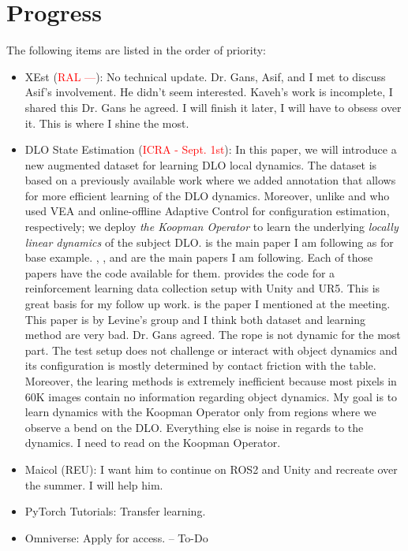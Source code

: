 \documentclass[11pt]{article}
\begin{document}
\section{Progress}
The following items are listed in the order of priority:
\begin{itemize}
    \item XEst (\textcolor{red}{RAL ---}): No technical update. Dr. Gans, Asif,
    and I met to discuss Asif's involvement. He didn't seem interested.
    Kaveh's work is incomplete, I shared this Dr. Gans he agreed. I will finish
    it later, I will have to obsess over it. This is where I shine the most.

    \item DLO State Estimation (\textcolor{red}{ICRA - Sept. 1st}): In this
    paper, we will introduce a new augmented dataset for learning DLO local
    dynamics. The dataset is based on a previously available work
    \cite{zhang2021deformable} where we added annotation that allows for more
    efficient learning of the DLO dynamics. Moreover, unlike \cite{zhang2021deformable}
    and \cite{yu2022shape} who used VEA and online-offline Adaptive Control for
    configuration estimation, respectively;
    we deploy \emph{the Koopman Operator} to
    learn the underlying \emph{locally linear dynamics} of the subject DLO.
    \cite{zhang2021deformable} is the main paper I am following as for base
    example. \cite{yu2022shape}, \cite{zhang2021deformable}, and \cite{zhang2021robots}
    are the main papers I am following. Each of those papers have the code
    available for them. \cite{yu2022shape} provides the code for a reinforcement
    learning data collection setup with Unity and UR5. This is great basis for
    my follow up work. \cite{nair2017combining} is the paper I mentioned at the
    meeting. This paper is by Levine's group and I think both dataset and learning
    method are very bad. Dr. Gans agreed. The rope is not dynamic for the most
    part. The test setup does not challenge or interact with object dynamics and
    its configuration is mostly determined by contact friction with the table.
    Moreover, the learing methods is extremely inefficient because most pixels
    in 60K images contain no information regarding object dynamics. My goal is
    to learn dynamics with the Koopman Operator only from regions where we observe
    a bend on the DLO. Everything else is noise in regards to the dynamics.
    I need to read on the Koopman Operator.
    \item Maicol (REU): I want him to continue on ROS2 and Unity and recreate
    \cite{yu2022shape} over the summer. I will help him.
    \item PyTorch Tutorials: Transfer learning.
    \item Omniverse: Apply for access. -- To-Do

  \end{itemize}


\newpage

\newpage


\end{document}
